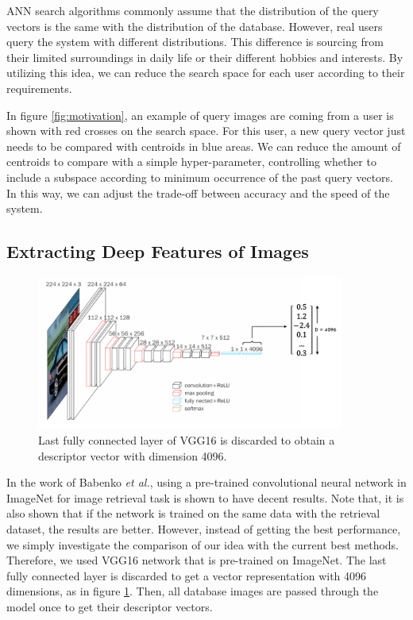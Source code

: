 ANN search algorithms commonly assume that the distribution of the query vectors is the same with the distribution of the database. 
However, real users query the system with different distributions.
This difference is sourcing from their limited surroundings in daily life or their different hobbies and interests. 
By utilizing this idea, we can reduce the search space for each user according to their requirements.

In figure \ref{fig:motivation}, an example of query images are coming from a user is shown with red crosses on the search space. 
For this user, a new query vector just needs to be compared with centroids in blue areas. 
We can reduce the amount of centroids to compare with a simple hyper-parameter, controlling whether to include a subspace according to minimum occurrence of the past query vectors. 
In this way, we can adjust the trade-off between accuracy and the speed of the system.


\subsection{Extracting Deep Features of Images}

\begin{figure}
    \centering
    \includegraphics[width=0.9\textwidth]{thesis/images/deep_features-fig.png}
    \caption{Last fully connected layer of VGG16\cite{simonyan2014very} is discarded to obtain a descriptor vector with dimension 4096.}
    \label{fig:vec-repr}
\end{figure}

In the work of Babenko \emph{et al.}\cite{babenko2014neural}, using a pre-trained convolutional neural network in ImageNet for image retrieval task is shown to have decent results. 
Note that, it is also shown that if the network is trained on the same data with the retrieval dataset, the results are better.
However, instead of getting the best performance, we simply investigate the comparison of our idea with the current best methods.
Therefore, we used VGG16\cite{simonyan2014very} network that is pre-trained on ImageNet\cite{deng2009imagenet}. 
The last fully connected layer is discarded to get a vector representation with 4096 dimensions, as in figure \ref{fig:vec-repr}.
Then, all database images are passed through the model once to get their descriptor vectors.

